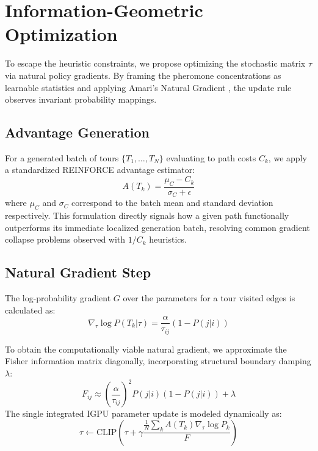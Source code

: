 \documentclass[conference]{IEEEtran}
\begin{document}
\section{Information-Geometric Optimization}

To escape the heuristic constraints, we propose optimizing the stochastic matrix $\tau$ via natural policy gradients. By framing the pheromone concentrations as learnable statistics and applying Amari's Natural Gradient \cite{amari1998natural}, the update rule observes invariant probability mappings. 

\subsection{Advantage Generation}
For a generated batch of tours $\{T_1, \dots, T_N\}$ evaluating to path costs $C_k$, we apply a standardized REINFORCE advantage estimator:
\begin{equation}
A(T_k) = \frac{\mu_C - C_k}{\sigma_C + \epsilon}
\end{equation}
where $\mu_C$ and $\sigma_C$ correspond to the batch mean and standard deviation respectively. This formulation directly signals how a given path functionally outperforms its immediate localized generation batch, resolving common gradient collapse problems observed with $1/C_k$ heuristics.

\subsection{Natural Gradient Step}
The log-probability gradient $G$ over the parameters for a tour visited edges is calculated as:
\begin{equation}
\nabla_{\tau} \log P(T_k|\tau) = \frac{\alpha}{\tau_{ij}} (1 - P(j|i))
\end{equation}

To obtain the computationally viable natural gradient, we approximate the Fisher information matrix diagonally, incorporating structural boundary damping $\lambda$:
\begin{equation}
F_{ij} \approx \left(\frac{\alpha}{\tau_{ij}}\right)^2 P(j|i)(1 - P(j|i)) + \lambda
\end{equation}
The single integrated IGPU parameter update is modeled dynamically as:
\begin{equation}
\tau \gets \text{CLIP} \left( \tau + \gamma \frac{\frac{1}{N} \sum_k A(T_k) \nabla_{\tau} \log P_k}{F} \right)
\end{equation}
\end{document}
